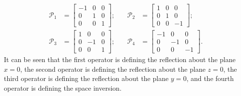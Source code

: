 \documentclass[a4paper, 12pt]{article}
\begin{document}
\begin{equation}\label{3D-P}
    \begin{aligned}
        \mathcal{P}_1 &= \begin{bmatrix}
            -1 & 0 & 0 \\
            0 & 1 & 0 \\
            0 & 0 & 1    
        \end{bmatrix} ; \quad &
        \mathcal{P}_2 &= \begin{bmatrix}
            1 & 0 & 0 \\
            0 & 1 & 0 \\
            0 & 0 & -1
        \end{bmatrix} ; \\
        \mathcal{P}_3 &= \begin{bmatrix}
            1 & 0 & 0 \\
            0 & -1 & 0 \\
            0 & 0 & 1
        \end{bmatrix} ; \quad &
        \mathcal{P}_4 &= \begin{bmatrix}
            -1 & 0 & 0 \\
            0 & -1 & 0 \\
            0 & 0 & -1
        \end{bmatrix} .
    \end{aligned}
\end{equation}
It can be seen that the first operator is defining the reflection about the plane \(x=0\), the second operator is defining the reflection about the plane \(z=0\), the third operator is defining the reflection about the plane \(y=0\), and the fourth operator is defining the space inversion.
\end{document}
